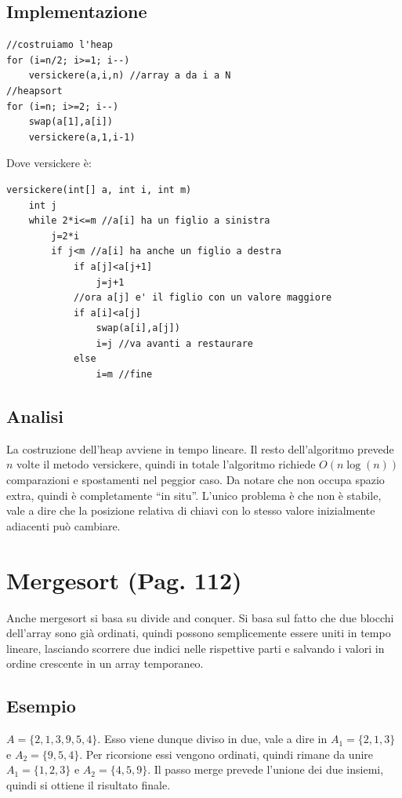 \documentclass[a4paper]{book}
\newcommand{\lstIndent}{4}
\begin{document}
\subsection*{Implementazione}
\begin{lstlisting}[tabsize=\lstIndent]
//costruiamo l'heap
for (i=n/2; i>=1; i--)
	versickere(a,i,n) //array a da i a N
//heapsort	
for (i=n; i>=2; i--)
	swap(a[1],a[i])
	versickere(a,1,i-1)
\end{lstlisting}                                                                          
Dove versickere è:
\begin{lstlisting}[tabsize=\lstIndent]
versickere(int[] a, int i, int m)
	int j
	while 2*i<=m //a[i] ha un figlio a sinistra
		j=2*i
		if j<m //a[i] ha anche un figlio a destra
			if a[j]<a[j+1]
				j=j+1
			//ora a[j] e' il figlio con un valore maggiore
			if a[i]<a[j]
				swap(a[i],a[j])
				i=j //va avanti a restaurare
			else
				i=m //fine		
\end{lstlisting}                                                                                                 
\subsection*{Analisi}
La costruzione dell'heap avviene in tempo lineare. Il resto dell'algoritmo prevede $n$ volte il metodo versickere, quindi in totale l'algoritmo richiede $O(n \log (n))$ comparazioni e spostamenti nel peggior caso. Da notare che non occupa spazio extra, quindi è completamente ``in situ''. L'unico problema è che non è stabile, vale a dire che la posizione relativa di chiavi con lo stesso valore inizialmente adiacenti può cambiare. 

\section{Mergesort (Pag. 112)}
Anche mergesort si basa su divide and conquer. Si basa sul fatto che due blocchi dell'array sono già ordinati, quindi possono semplicemente essere uniti in tempo lineare, lasciando scorrere due indici nelle rispettive parti e salvando i valori in ordine crescente in un array temporaneo.

\subsection*{Esempio}
$A=\{2, 1, 3, 9, 5, 4\}$. Esso viene dunque diviso in due, vale a dire in $A_1 =\{2,1,3\}$ e $A_2 =\{9,5,4\}$. Per ricorsione essi vengono ordinati, quindi rimane da unire $A_1 =\{1,2,3\}$ e $A_2 =\{4,5,9\}$. Il passo merge prevede l'unione dei due insiemi, quindi si ottiene il risultato finale.
\end{document}
